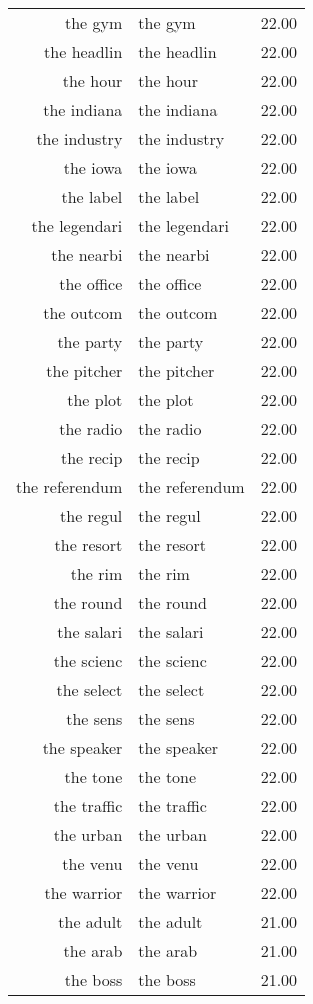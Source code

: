 \begin{table}[ht]
\begin{tabular}{rlr}
  the gym & the gym & 22.00 \\ 
  the headlin & the headlin & 22.00 \\ 
  the hour & the hour & 22.00 \\ 
  the indiana & the indiana & 22.00 \\ 
  the industry & the industry & 22.00 \\ 
  the iowa & the iowa & 22.00 \\ 
  the label & the label & 22.00 \\ 
  the legendari & the legendari & 22.00 \\ 
  the nearbi & the nearbi & 22.00 \\ 
  the office & the office & 22.00 \\ 
  the outcom & the outcom & 22.00 \\ 
  the party & the party & 22.00 \\ 
  the pitcher & the pitcher & 22.00 \\ 
  the plot & the plot & 22.00 \\ 
  the radio & the radio & 22.00 \\ 
  the recip & the recip & 22.00 \\ 
  the referendum & the referendum & 22.00 \\ 
  the regul & the regul & 22.00 \\ 
  the resort & the resort & 22.00 \\ 
  the rim & the rim & 22.00 \\ 
  the round & the round & 22.00 \\ 
  the salari & the salari & 22.00 \\ 
  the scienc & the scienc & 22.00 \\ 
  the select & the select & 22.00 \\ 
  the sens & the sens & 22.00 \\ 
  the speaker & the speaker & 22.00 \\ 
  the tone & the tone & 22.00 \\ 
  the traffic & the traffic & 22.00 \\ 
  the urban & the urban & 22.00 \\ 
  the venu & the venu & 22.00 \\ 
  the warrior & the warrior & 22.00 \\ 
  the adult & the adult & 21.00 \\ 
  the arab & the arab & 21.00 \\ 
  the boss & the boss & 21.00 \\ 

\end{tabular}
\end{table}

